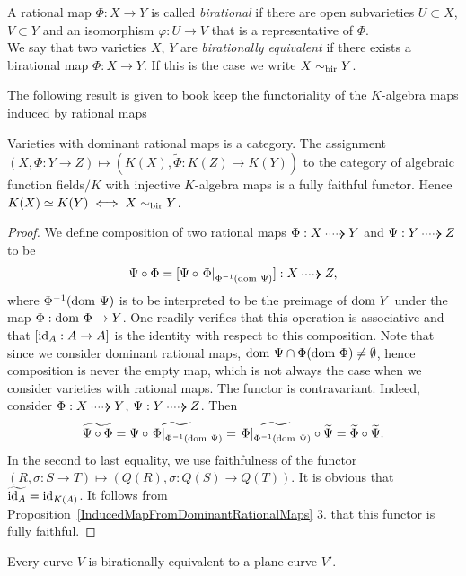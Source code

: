     \begin{definition}
        A rational map $\Phi: X\rightarrow Y$ is called \textit{birational} if there are open subvarieties $U\subset X$, $V\subset Y$ and an isomorphism $\varphi: U\rightarrow V$ that is a representative of $\Phi$. \\
        We say that two varieties $X$, $Y$ are \textit{birationally equivalent} if there exists a birational map $\Phi : X\rightarrow Y$. If this is the case we write $X \sim_{\mathrm{bir}} Y$.
    \end{definition}
    The following result is given to book keep the functoriality of the $K$-algebra maps induced by rational maps 
    \begin{theorem}
        Varieties with dominant rational maps is a category. The assignment $(X,\Phi: Y\rightarrow Z)\mapsto (K(X), \widetilde{\Phi}: K(Z)\rightarrow K(Y))$ to the category of algebraic function fields$/K$ with injective $K$-algebra maps is a fully faithful functor. Hence $K(X)\simeq K(Y)\iff X \sim_{\mathrm{bir}} Y$.
    \end{theorem}
    \begin{proof}
        We define composition of two rational maps $\Phi: X\dottedarrow Y$ and $\Psi: Y\dottedarrow Z$ to be 
        $$\Psi\circ \Phi = [\Psi \circ \left.\Phi\right|_{\Phi^{-1}(\dom\ \Psi)}] : X\dottedarrow Z,$$
        where $\Phi^{-1}(\mathrm{dom} \ \Psi)$ is to be interpreted to be the preimage of $\dom\ Y$ under the map $\Phi: \mathrm{dom} \ \Phi \rightarrow Y$. One readily verifies that this operation is associative and that $[\mathrm{id}_A : A \rightarrow A]$ is the identity with respect to this composition. Note that since we consider dominant rational maps, $\mathrm{dom} \ \Psi \cap \Phi(\mathrm{dom} \ \Phi)\neq \emptyset$, hence composition is never the empty map, which is not always the case when we consider varieties with  rational maps. The functor is contravariant. Indeed, consider $\Phi: X\dottedarrow Y$, $\Psi: Y\dottedarrow Z$. Then
        $$\widetilde{\Psi\circ \Phi}= \widetilde{\Psi \circ \left.\Phi\right|_{\Phi^{-1}(\mathrm{dom}\ \Psi)}} = \widetilde{\left.\Phi\right|_{\Phi^{-1}(\mathrm{dom}\ \Psi)}}\circ \widetilde{\Psi} = \widetilde{\Phi}\circ \widetilde{\Psi}.$$
        In the second to last equality, we use faithfulness of the functor $(R, \sigma : S\rightarrow T) \mapsto (Q(R),\sigma : Q(S)\rightarrow Q(T))$. It is obvious that $\widetilde{\mathrm{id}_A} = \mathrm{id}_{K(A)}$. It follows from Proposition~\ref{InducedMapFromDominantRationalMaps} 3. that this functor is fully faithful.
    \end{proof}
    \begin{corollary}\label{CurveIsBirationallyEquivalentToPlaneCurve}
        Every curve $V$ is birationally equivalent to a plane curve $V'$.
    \end{corollary}
